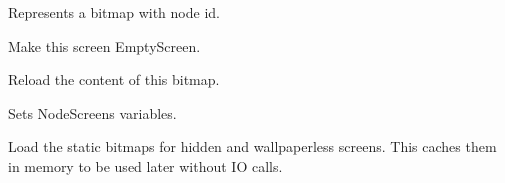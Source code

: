 \documentclass[letterpaper,10pt,english]{sphinxmanual}
\begin{document}
\begin{fulllineitems}
\label{graphicaldesign:graphicaldesign.NodeScreen}
Represents a bitmap with node id.

\begin{fulllineitems}
\label{graphicaldesign:graphicaldesign.NodeScreen.EmptyScreen}
Make this screen EmptyScreen.

\end{fulllineitems}


\begin{fulllineitems}
\label{graphicaldesign:graphicaldesign.NodeScreen.ReloadAs}
Reload the content of this bitmap.

\end{fulllineitems}


\begin{fulllineitems}
\label{graphicaldesign:graphicaldesign.NodeScreen.SetNodeVars}
Sets NodeScreens variables.

\end{fulllineitems}


\begin{fulllineitems}
\label{graphicaldesign:graphicaldesign.NodeScreen.update_bitmaps}
Load the static bitmaps for hidden and wallpaperless screens.
This caches them in memory to be used later without IO calls.

\end{fulllineitems}


\end{fulllineitems}

\end{document}
